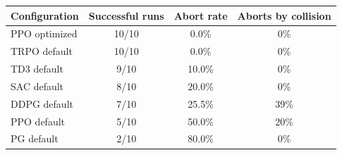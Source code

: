 \begin{tabular}{lccc}
\toprule
Configuration & Successful runs & Abort rate & Aborts by collision \\
\midrule
PPO optimized & 10/10 & 0.0\% & 0\% \\
TRPO default & 10/10 & 0.0\% & 0\% \\
TD3 default & 9/10 & 10.0\% & 0\% \\
SAC default & 8/10 & 20.0\% & 0\% \\
DDPG default & 7/10 & 25.5\% & 39\% \\
PPO default & 5/10 & 50.0\% & 20\% \\
PG default & 2/10 & 80.0\% & 0\% \\
\bottomrule
\end{tabular}
